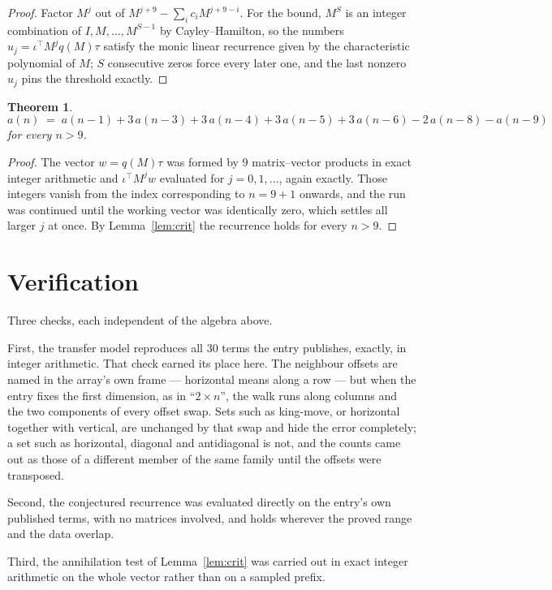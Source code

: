\documentclass[11pt,a4paper]{article}
\theoremstyle{plain}
\newtheorem{theorem}{Theorem}
\theoremstyle{definition}
\begin{document}
\begin{proof}
Factor $M^{j}$ out of $M^{j+9}-\sum_ic_iM^{j+9-i}$. For the bound, $M^{S}$
is an integer combination of $I,M,\dots,M^{S-1}$ by Cayley--Hamilton, so the numbers
$u_j=\iota^{\!\top}M^{j}q(M)\tau$ satisfy the monic linear recurrence given by the
characteristic polynomial of $M$; $S$ consecutive zeros force every later one, and the last
nonzero $u_j$ pins the threshold exactly.
\end{proof}

\begin{theorem}
\[
a(n)\;=\;a(n-1) + 3\,a(n-3) + 3\,a(n-4) + 3\,a(n-5) + 3\,a(n-6) - 2\,a(n-8) - a(n-9)
\]
for every $n>9$.
\end{theorem}

\begin{proof}
The vector $w=q(M)\tau$ was formed by $9$ matrix--vector products in exact integer
arithmetic and $\iota^{\!\top}M^{j}w$ evaluated for $j=0,1,\dots$, again exactly. Those
integers vanish from the index corresponding to $n=9+1$ onwards, and the run was
continued until the working vector was identically zero, which settles all larger $j$ at once.
By Lemma~\ref{lem:crit} the recurrence holds for every $n>9$.
\end{proof}

\section{Verification}

Three checks, each independent of the algebra above.

First, the transfer model reproduces all $30$ terms the entry publishes, exactly, in
integer arithmetic. That check earned its place here. The neighbour offsets are named in the
array's own frame --- horizontal means along a row --- but when the entry fixes the first
dimension, as in ``$2\times n$'', the walk runs along columns and the two components of every
offset swap. Sets such as king-move, or horizontal together with vertical, are unchanged by
that swap and hide the error completely; a set such as horizontal, diagonal and antidiagonal
is not, and the counts came out as those of a different member of the same family until the
offsets were transposed.

Second, the conjectured recurrence was evaluated directly on the entry's own published terms,
with no matrices involved, and holds wherever the proved range and the data overlap.

Third, the annihilation test of Lemma~\ref{lem:crit} was carried out in exact integer
arithmetic on the whole vector rather than on a sampled prefix.
\end{document}
